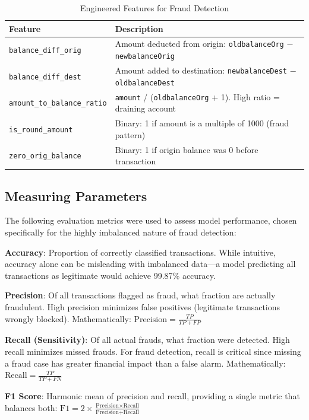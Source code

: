\documentclass[conference]{IEEEtran}
\begin{document}
\begin{table}[h]
\caption{Engineered Features for Fraud Detection}
\label{tab:features}
\centering
\small
\begin{tabular}{|l|p{4.5cm}|}
\hline
\textbf{Feature} & \textbf{Description} \\
\hline
\texttt{balance\_diff\_orig} & Amount deducted from origin: \texttt{oldbalanceOrg} $-$ \texttt{newbalanceOrig} \\
\hline
\texttt{balance\_diff\_dest} & Amount added to destination: \texttt{newbalanceDest} $-$ \texttt{oldbalanceDest} \\
\hline
\texttt{amount\_to\_balance\_ratio} & \texttt{amount} / (\texttt{oldbalanceOrg} + 1). High ratio = draining account \\
\hline
\texttt{is\_round\_amount} & Binary: 1 if amount is a multiple of 1000 (fraud pattern) \\
\hline
\texttt{zero\_orig\_balance} & Binary: 1 if origin balance was 0 before transaction \\
\hline
\end{tabular}
\end{table}

\subsection{Measuring Parameters}
The following evaluation metrics were used to assess model performance, chosen specifically for the highly imbalanced nature of fraud detection:

\textbf{Accuracy}: Proportion of correctly classified transactions. While intuitive, accuracy alone can be misleading with imbalanced data---a model predicting all transactions as legitimate would achieve 99.87\% accuracy.

\textbf{Precision}: Of all transactions flagged as fraud, what fraction are actually fraudulent. High precision minimizes false positives (legitimate transactions wrongly blocked). Mathematically: $\text{Precision} = \frac{TP}{TP + FP}$

\textbf{Recall (Sensitivity)}: Of all actual frauds, what fraction were detected. High recall minimizes missed frauds. For fraud detection, recall is critical since missing a fraud case has greater financial impact than a false alarm. Mathematically: $\text{Recall} = \frac{TP}{TP + FN}$

\textbf{F1 Score}: Harmonic mean of precision and recall, providing a single metric that balances both: $\text{F1} = 2 \times \frac{\text{Precision} \times \text{Recall}}{\text{Precision} + \text{Recall}}$
\end{document}

